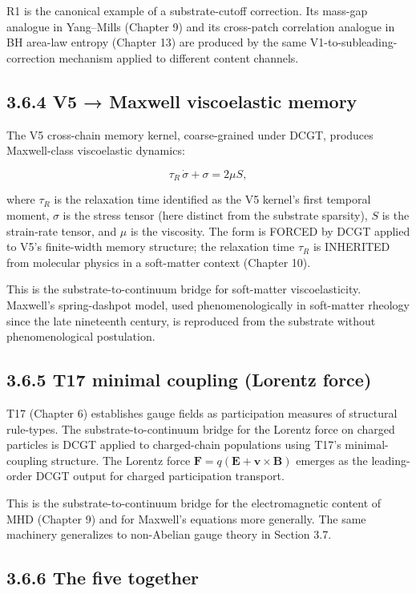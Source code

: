 \documentclass[11pt]{book}
\begin{document}
R1 is the canonical example of a substrate-cutoff correction. Its mass-gap analogue in Yang–Mills (Chapter 9) and its cross-patch correlation analogue in BH area-law entropy (Chapter 13) are produced by the same V1-to-subleading-correction mechanism applied to different content channels.

\subsection{3.6.4 V5 → Maxwell viscoelastic memory}

The V5 cross-chain memory kernel, coarse-grained under DCGT, produces Maxwell-class viscoelastic dynamics:

\[
\tau_R\,\dot\sigma + \sigma = 2\mu S,
\]

where $\tau_R$ is the relaxation time identified as the V5 kernel's first temporal moment, $\sigma$ is the stress tensor (here distinct from the substrate sparsity), $S$ is the strain-rate tensor, and $\mu$ is the viscosity. The form is FORCED by DCGT applied to V5's finite-width memory structure; the relaxation time $\tau_R$ is INHERITED from molecular physics in a soft-matter context (Chapter 10).

This is the substrate-to-continuum bridge for soft-matter viscoelasticity. Maxwell's spring-dashpot model, used phenomenologically in soft-matter rheology since the late nineteenth century, is reproduced from the substrate without phenomenological postulation.

\subsection{3.6.5 T17 minimal coupling (Lorentz force)}

T17 (Chapter 6) establishes gauge fields as participation measures of structural rule-types. The substrate-to-continuum bridge for the Lorentz force on charged particles is DCGT applied to charged-chain populations using T17's minimal-coupling structure. The Lorentz force $\mathbf{F} = q(\mathbf{E} + \mathbf{v}\times\mathbf{B})$ emerges as the leading-order DCGT output for charged participation transport.

This is the substrate-to-continuum bridge for the electromagnetic content of MHD (Chapter 9) and for Maxwell's equations more generally. The same machinery generalizes to non-Abelian gauge theory in Section 3.7.

\subsection{3.6.6 The five together}
\end{document}
